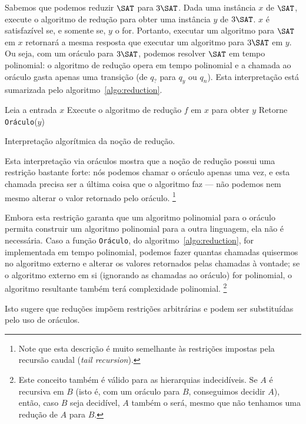 Sabemos que podemos reduzir $\SAT$ para $3\SAT$.
Dada uma instância $x$ de $\SAT$,
execute o algoritmo de redução para obter uma instância $y$ de $3\SAT$.
$x$ é satisfazível se, e somente se, $y$ o for.
Portanto, executar um algoritmo para $\SAT$ em $x$
retornará a mesma resposta
que executar um algoritmo para $3\SAT$ em $y$.
Ou seja, com um oráculo para $3\SAT$,
podemos resolver $\SAT$ em tempo polinomial:
o algoritmo de redução opera em tempo polinomial
e a chamada ao oráculo gasta apenas uma transição
(de $q_?$ para $q_y$ ou $q_n$).
Esta interpretação está sumarizada pelo algoritmo~\ref{algo:reduction}.

\begin{algorithm}[h]
    Leia a entrada $x$\;
    Execute o algoritmo de redução $f$ em $x$ para obter $y$\;
    Retorne \texttt{Oráculo}($y$)\;
    \caption{
        Interpretação algorítmica da noção de redução.
    }
    \label{algo:reduction}
\end{algorithm}

Esta interpretação via oráculos mostra que
a noção de redução possui uma restrição bastante forte:
nós podemos chamar o oráculo apenas uma vez,
e esta chamada precisa ser a última coisa que o algoritmo faz
--- não podemos nem mesmo alterar o valor retornado pelo oráculo.%
\footnote{
    Note que esta descrição é muito semelhante
    às restrições impostas pela recursão caudal
    (\emph{tail recursion}).
}

Embora esta restrição garanta que
um algoritmo polinomial para o oráculo
permita construir um algoritmo polinomial para a outra linguagem,
ela não é necessária.
Caso a função \texttt{Oráculo}, do algoritmo~\ref{algo:reduction},
for implementada em tempo polinomial,
podemos fazer quantas chamadas quisermos no algoritmo externo
e alterar os valores retornados pelas chamadas à vontade;
se o algoritmo externo em si
(ignorando as chamadas ao oráculo)
for polinomial,
o algoritmo resultante também terá complexidade polinomial.%
\footnote{
    Este conceito também é válido para as hierarquias indecidíveis.
    Se $A$ é recursiva em $B$
    (isto é, com um oráculo para $B$, conseguimos decidir $A$),
    então, caso $B$ seja decidível,
    $A$ também o será,
    mesmo que não tenhamos uma redução de $A$ para $B$.
}

Isto sugere que reduções impõem restrições arbitrárias
e podem ser substituídas pelo uso de oráculos.
